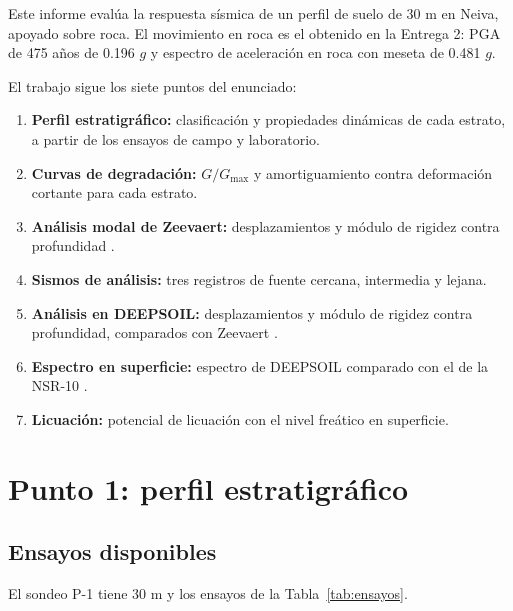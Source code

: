 \documentclass[12pt,oneside]{article}
\begin{document}
Este informe evalúa la respuesta sísmica de un perfil de suelo de 30 m en
Neiva, apoyado sobre roca. El movimiento en roca es el obtenido en la
Entrega 2: PGA de 475 años de 0.196 $g$ y espectro de aceleración en roca
con meseta de 0.481 $g$.

El trabajo sigue los siete puntos del enunciado:
\begin{enumerate}
    \item \textbf{Perfil estratigráfico:} clasificación y propiedades
    dinámicas de cada estrato, a partir de los ensayos de campo y laboratorio.
    \item \textbf{Curvas de degradación:} $G/G_{\max}$ y amortiguamiento
    contra deformación cortante para cada estrato.
    \item \textbf{Análisis modal de Zeevaert:} desplazamientos y módulo de
    rigidez contra profundidad \parencite{zeevaert1983}.
    \item \textbf{Sismos de análisis:} tres registros de fuente cercana,
    intermedia y lejana.
    \item \textbf{Análisis en DEEPSOIL:} desplazamientos y módulo de rigidez
    contra profundidad, comparados con Zeevaert \parencite{deepsoil2020}.
    \item \textbf{Espectro en superficie:} espectro de DEEPSOIL comparado con
    el de la NSR-10 \parencite{nsr10}.
    \item \textbf{Licuación:} potencial de licuación con el nivel freático en
    superficie.
\end{enumerate}

\section{Punto 1: perfil estratigráfico}

\subsection{Ensayos disponibles}

El sondeo P-1 tiene 30 m y los ensayos de la Tabla~\ref{tab:ensayos}.
\end{document}
